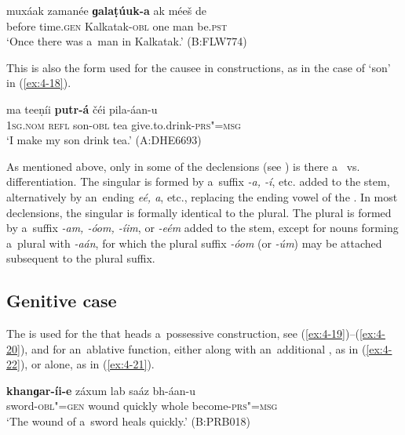 \begin{exe}
\ex
\label{ex:4-17}
\gll muxáak zamanée \textbf{ɡalaṭúuk-a} ak méeš de \\
	before time.\textsc{gen} Kalkatak-\textsc{obl} one man be.\textsc{pst} \\
\glt `Once there was a~man in Kalkatak.' (B:FLW774)
\end{exe}

This is also the form used for the causee in  constructions, as in the case of `son' in (\ref{ex:4-18}). 


\begin{exe}
\ex
\label{ex:4-18}
\gll ma teeṇíi \textbf{putr-á} čéi pila-áan-u \\
	\textsc{1sg.nom} \textsc{refl} son-\textsc{obl} tea give.to.drink-\textsc{prs"=msg} \\
\glt `I make my son drink tea.' (A:DHE6693)
\end{exe}

As mentioned above, only in some of the declensions (see ) is there a~ vs.  differentiation. The singular  is formed by a~suffix \textit{-a, -í}, etc. added to the  stem, alternatively by an~ending \textit{eé, a}, etc., replacing the ending vowel of the . In most declensions, the  singular is formally identical to the  plural. The  plural is formed by a~suffix \textit{-am, -óom, -íim}, or \textit{-eém} added to the  stem, except for nouns forming a~plural with \textit{-aán}, for which the plural  suffix \textit{-óom} (or \textit{-úm}) may be attached subsequent to the plural suffix.

\subsection{Genitive case}
\label{subsec:4-5-3}

The  is used for the  that heads a~possessive construction, see (\ref{ex:4-19})--(\ref{ex:4-20}), and for an~ablative function, either along with an~additional , as in (\ref{ex:4-22}), or alone, as in (\ref{ex:4-21}).


\begin{exe}
\ex
\label{ex:4-19}
\gll \textbf{khanɡar-íi-e} záxum lab saáz bh-áan-u \\
	sword-\textsc{obl"=gen} wound quickly whole become-\textsc{prs"=msg} \\
\glt `The wound of a~sword heals quickly.' (B:PRB018)
\end{exe}

